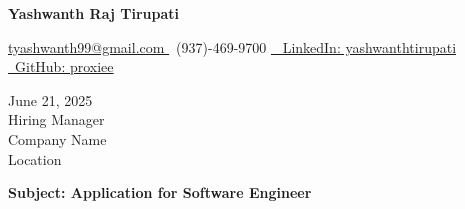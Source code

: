 \documentclass[letterpaper,11pt]{article}
\begin{document}
\begin{center}
    \textbf{\LARGE Yashwanth Raj Tirupati}
    \vspace{4pt}
    
    \small
    \href{mailto:tyashwanth99@gmail.com}{ tyashwanth99@gmail.com }\textbar
     ~(937)-469-9700 \textbar
    \href{https://linkedin.com/in/yashwanthtirupati}{~ LinkedIn: yashwanthtirupati }\textbar 
    \href{https://github.com/proxiee}{~GitHub: proxiee }
\end{center}

\vspace{20pt}

\begin{flushleft}
    June 21, 2025 \\
    \vspace{12pt}
    Hiring Manager \\
    Company Name \\
    Location \\
\end{flushleft}


\begin{flushleft}
\textbf{Subject: Application for Software Engineer}
\end{flushleft}


\end{document}
